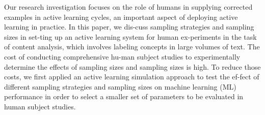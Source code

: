 Our research investigation focuses on the role of humans in supplying corrected examples in active learning cycles, an important aspect of deploying active learning in practice.  In this paper, we dis-cuss sampling strategies and sampling sizes in set-ting up an active learning system for human ex-periments in the task of content analysis, which involves labeling concepts in large volumes of text.  The cost of conducting comprehensive hu-man subject studies to experimentally determine the effects of sampling sizes and sampling sizes is high. To reduce those costs, we first applied an active learning simulation approach to test the ef-fect of different sampling strategies and sampling sizes on machine learning (ML) performance in order to select a smaller set of parameters to be evaluated in human subject studies.
